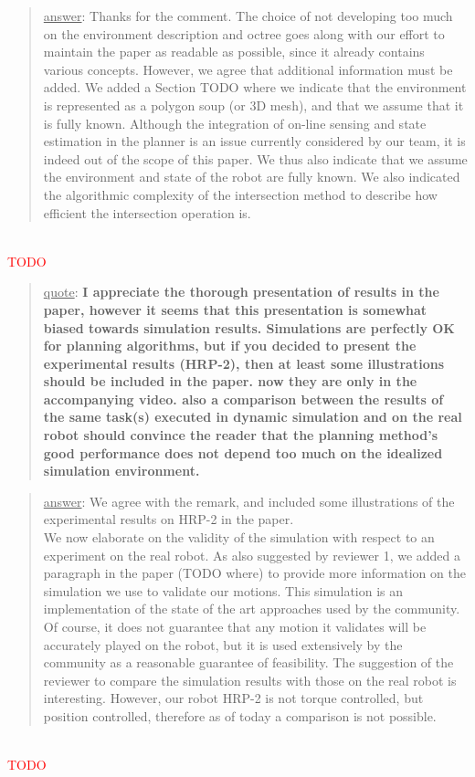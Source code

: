 \documentclass[a4paper]{article}
\newcommand{\ndone}[0]{\textcolor{red}{TODO}}
\newcommand\quot[1]{\begin{quote} \underline{quote}: \textbf{#1}\end{quote}}
\newcommand\as[1]{\begin{quote} \underline{answer}: {#1}\end{quote} \leavevmode \\ }
\begin{document}
\as{Thanks for the comment. The choice of not developing too much on the environment description and octree goes along with 
our effort to maintain the paper as readable as possible, since it already contains various concepts. However,
we agree that additional information must be added. We added a Section TODO where we indicate that the environment is represented as a polygon soup (or 3D mesh), and
that we assume that it is fully known. Although the integration of on-line sensing and state estimation in the planner is an issue currently considered by our team, it is indeed
out of the scope of this paper. We thus also indicate that we assume the environment and state of the robot are fully known. We also indicated the algorithmic complexity of the intersection
method to describe how efficient the intersection operation is.} \ndone

\quot{I appreciate the thorough presentation of results in the paper, however
it seems that this presentation is somewhat biased towards simulation
results. Simulations are perfectly OK for planning algorithms, but if
you decided to present the experimental results (HRP-2), then at least some
illustrations should be included in the paper. now they are only in the
accompanying video.  also a comparison between the results of the same
task(s) executed in dynamic simulation and on the real robot should
convince the reader that the planning method's good performance does
not depend too much on the idealized simulation environment. }
\as{We agree with the remark, and included some illustrations of the experimental results on HRP-2 in the paper. \\
We now elaborate on the validity of the simulation with respect to an experiment on the real robot. As also suggested by reviewer 1, we added a paragraph
in the paper (TODO where) to provide more information on the simulation we use to validate our motions. This simulation is an implementation of the state of the art approaches used by the community. Of course, it does not guarantee that any motion it validates will be accurately played on the robot, but it is used extensively by the community as a reasonable guarantee of feasibility.  The suggestion of the reviewer to compare the simulation results with those on the real robot is interesting. However, our robot HRP-2 is not torque controlled, but position controlled, therefore as of today a comparison is not possible.}\ndone
\end{document}
